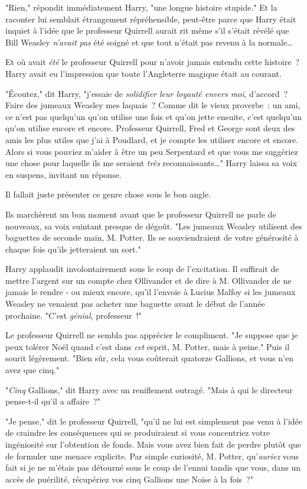 "Rien," répondit immédiatement Harry, "une longue histoire stupide." Et la raconter lui semblait étrangement répréhensible, peut-être parce que Harry était inquiet à l'idée que le professeur Quirrell aurait rit même s'il s'était révélé que Bill Weasley \emph{n'avait} \emph{pas} été soigné et que tout n'était pas revenu à la normale…

Et où avait \emph{été} le professeur Quirrell pour n'avoir jamais entendu cette histoire~? Harry avait eu l'impression que toute l'Angleterre magique était au courant.

"Écoutez," dit Harry, "j'essaie de \emph{solidifier leur loyauté envers moi}, d'accord~? Faire des jumeaux Weasley mes laquais~? Comme dit le vieux proverbe~: un ami, ce n'est pas quelqu'un qu'on utilise une fois et qu'on jette ensuite, c'est quelqu'un qu'on utilise encore et encore. Professeur Quirrell, Fred et George sont deux des amis les plus utiles que j'ai à Poudlard, et je compte les utiliser encore et encore. Alors si vous pouviez m'aider à être un peu Serpentard et que vous me suggériez une chose pour laquelle ils me seraient \emph{très} reconnaissants…" Harry laissa sa voix en suspens, invitant un réponse.

Il fallait juste présenter ce genre chose sous le bon angle.

Ils marchèrent un bon moment avant que le professeur Quirrell ne parle de nouveaux, sa voix suintant presque de dégoût. "Les jumeaux Weasley utilisent des baguettes de seconde main, M. Potter. Ils se souviendraient de votre générosité à chaque fois qu'ils jetteraient un sort."

Harry applaudit involontairement sous le coup de l'excitation. Il suffirait de mettre l'argent sur un compte chez Ollivander et de dire à M. Ollivander de ne jamais le rendre - ou mieux encore, qu'il l'envoie à Lucius Malfoy si les jumeaux Weasley ne venaient pas acheter une baguette avant le début de l'année prochaine. "C'est \emph{génial}, professeur~!"

Le professeur Quirrell ne sembla pas apprécier le compliment. "Je suppose que je peux tolérer Noël quand c'est dans \emph{cet} esprit, M. Potter, mais à peine." Puis il sourit légèrement. "Bien sûr, cela vous coûterait quatorze Gallions, et vous n'en avez que cinq."

"\emph{Cinq} Gallions," dit Harry avec un reniflement outragé. "Mais à qui le directeur pense-t-il qu'il a affaire~?"

"Je pense," dit le professeur Quirrell, "qu'il ne lui est simplement pas venu à l'idée de craindre les conséquences qui se produiraient si vous concentriez votre ingéniosité sur l'obtention de fonds. Mais vous avez bien fait de perdre plutôt que de formuler une menace explicite. Par simple curiosité, M. Potter, qu'\emph{auriez} vous fait si je ne m'étais pas détourné sous le coup de l'ennui tandis que vous, dans un accès de puérilité, récupériez vos cinq Gallions une Noise à la fois~?"

